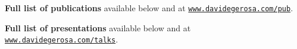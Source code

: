 \documentclass[a4paper]{moderncv}
\begin{document}
\textbf{Full list of publications} available below and at \href{http://www.davidegerosa.com/pub}{\texttt{www.davidegerosa.com/pub}}.
\vspace{0.2cm}


\textbf{Full list of presentations} available below and at \href{http://www.davidegerosa.com/talks}{\texttt{www.davidegerosa.com/talks}}.
\end{document}
